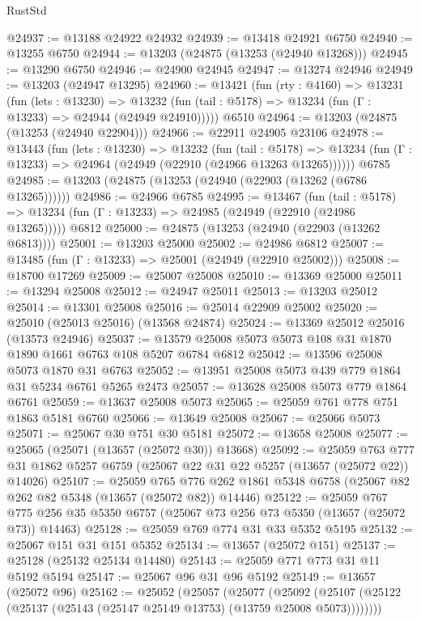 \begin{lexlean}{RustStd}
\begin{coremodule}
@24937 := @13188 @24922 @24932
@24939 := @13418 @24921 @6750
@24940 := @13255 @6750
@24944 := @13203 (@24875 (@13253 (@24940 @13268)))
@24945 := @13290 @6750
@24946 := @24900 @24945
@24947 := @13274 @24946
@24949 := @13203 (@24947 @13295)
@24960 := @13421
    (fun (rty : @4160) =>
    @13231
      (fun (lets : @13230) =>
      @13232 (fun (tail : @5178) => @13234 (fun (Γ : @13233) => @24944 (@24949 @24910)))))
    @6510
@24964 := @13203 (@24875 (@13253 (@24940 @22904)))
@24966 := @22911 @24905 @23106
@24978 := @13443
    (fun (lets : @13230) =>
    @13232
      (fun (tail : @5178) =>
      @13234 (fun (Γ : @13233) => @24964 (@24949 (@22910 (@24966 @13263 @13265))))))
    @6785
@24985 := @13203 (@24875 (@13253 (@24940 (@22903 (@13262 (@6786 @13265))))))
@24986 := @24966 @6785
@24995 := @13467
    (fun (tail : @5178) => @13234 (fun (Γ : @13233) => @24985 (@24949 (@22910 (@24986 @13265)))))
    @6812
@25000 := @24875 (@13253 (@24940 (@22903 (@13262 @6813))))
@25001 := @13203 @25000
@25002 := @24986 @6812
@25007 := @13485 (fun (Γ : @13233) => @25001 (@24949 (@22910 @25002)))
@25008 := @18700 @17269
@25009 := @25007 @25008
@25010 := @13369 @25000
@25011 := @13294 @25008
@25012 := @24947 @25011
@25013 := @13203 @25012
@25014 := @13301 @25008
@25016 := @25014 @22909 @25002
@25020 := @25010 (@25013 @25016) (@13568 @24874)
@25024 := @13369 @25012 @25016 (@13573 @24946)
@25037 := @13579 @25008 @5073 @5073 @108 @31 @1870 @1890 @1661 @6763 @108 @5207 @6784 @6812
@25042 := @13596 @25008 @5073 @1870 @31 @6763
@25052 := @13951 @25008 @5073 @439 @779 @1864 @31 @5234 @6761 @5265 @2473
@25057 := @13628 @25008 @5073 @779 @1864 @6761
@25059 := @13637 @25008 @5073
@25065 := @25059 @761 @778 @751 @1863 @5181 @6760
@25066 := @13649 @25008
@25067 := @25066 @5073
@25071 := @25067 @30 @751 @30 @5181
@25072 := @13658 @25008
@25077 := @25065 (@25071 (@13657 (@25072 @30)) @13668)
@25092 := @25059
    @763
    @777
    @31
    @1862
    @5257
    @6759
    (@25067 @22 @31 @22 @5257 (@13657 (@25072 @22)) @14026)
@25107 := @25059
    @765
    @776
    @262
    @1861
    @5348
    @6758
    (@25067 @82 @262 @82 @5348 (@13657 (@25072 @82)) @14446)
@25122 := @25059
    @767
    @775
    @256
    @35
    @5350
    @6757
    (@25067 @73 @256 @73 @5350 (@13657 (@25072 @73)) @14463)
@25128 := @25059 @769 @774 @31 @33 @5352 @5195
@25132 := @25067 @151 @31 @151 @5352
@25134 := @13657 (@25072 @151)
@25137 := @25128 (@25132 @25134 @14480)
@25143 := @25059 @771 @773 @31 @11 @5192 @5194
@25147 := @25067 @96 @31 @96 @5192
@25149 := @13657 (@25072 @96)
@25162 := @25052
    (@25057
      (@25077
        (@25092 (@25107 (@25122 (@25137 (@25143 (@25147 @25149 @13753) (@13759 @25008 @5073))))))))

\end{coremodule}
\end{lexlean}
